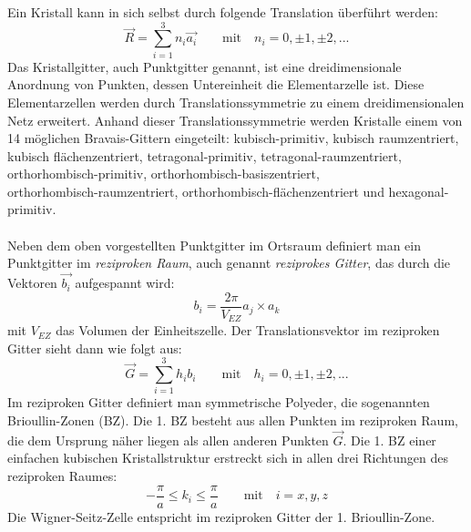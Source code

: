 \documentclass[a4paper,titlepage]{scrartcl}
\numberwithin{equation}{section}
\begin{document}
Ein Kristall kann in sich selbst durch folgende Translation überführt werden:
\begin{equation*}
\vec{R}=\sum_{i=1}^3 n_i \vec{a_i} \quad \quad \text{mit} \quad n_i=0, \pm 1, \pm 2, ...
\end{equation*}
Das Kristallgitter, auch Punktgitter genannt, ist eine dreidimensionale Anordnung von Punkten, dessen Untereinheit die Elementarzelle ist. Diese Elementarzellen werden durch Translationssymmetrie zu einem dreidimensionalen Netz erweitert. Anhand dieser Translationssymmetrie werden Kristalle einem von 14 möglichen Bravais-Gittern eingeteilt: kubisch-primitiv, kubisch raumzentriert, kubisch flächenzentriert, tetragonal-primitiv, tetragonal-raumzentriert, orthorhombisch-primitiv, orthorhombisch-basiszentriert,\\orthorhombisch-raumzentriert, orthorhombisch-flächenzentriert und hexagonal-primitiv.\\ \\
Neben dem oben vorgestellten Punktgitter im Ortsraum definiert man ein Punktgitter im \emph{reziproken Raum}, auch genannt \emph{reziprokes Gitter}, das durch die Vektoren $\vec{b_i}$ aufgespannt wird:
\begin{equation*}
b_i=\frac{2 \pi}{V_{EZ}} a_j \times a_k
\end{equation*}
mit $V_{EZ}$ das Volumen der Einheitszelle. Der Translationsvektor im reziproken Gitter sieht dann wie folgt aus:
\begin{equation*}
\vec{G}=\sum_{i=1}^3 h_i b_i \quad \quad \text{mit} \quad h_i=0, \pm 1, \pm 2, ...
\end{equation*}
Im reziproken Gitter definiert man symmetrische Polyeder, die sogenannten Brioullin-Zonen (BZ). Die 1. BZ besteht aus allen Punkten im reziproken Raum, die dem Ursprung näher liegen als allen anderen Punkten $\vec{G}$. Die 1. BZ einer einfachen kubischen Kristallstruktur erstreckt sich in allen drei Richtungen des reziproken Raumes:
\begin{equation*}
-\frac{\pi}{a} \leq k_i \leq \frac{\pi}{a} \quad \quad \text{mit} \quad i=x,y,z
\end{equation*}
Die Wigner-Seitz-Zelle entspricht im reziproken Gitter der 1. Brioullin-Zone.
\end{document}
